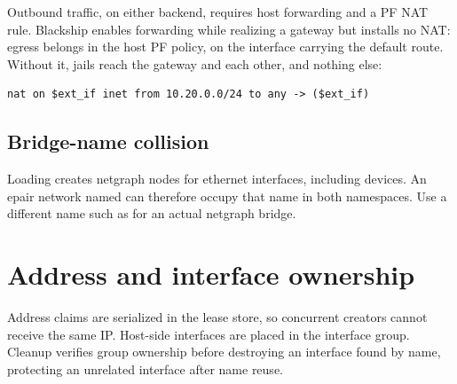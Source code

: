\begin{shipfigure}
\end{shipfigure}

Outbound traffic, on either backend, requires host forwarding and a PF NAT
rule. Blackship enables forwarding while realizing a gateway but installs no
NAT: egress belongs in the host PF policy, on the interface carrying the
default route. Without it, jails reach the gateway and each other, and nothing
else:

\begin{lstlisting}
nat on $ext_if inet from 10.20.0.0/24 to any -> ($ext_if)
\end{lstlisting}

\subsection{Bridge-name collision}

Loading  creates netgraph nodes for ethernet interfaces,
including  devices. An epair network named
 can therefore occupy that name in both namespaces. Use a
different name such as  for an actual netgraph bridge.

\section{Address and interface ownership}

Address claims are serialized in the lease store, so concurrent creators cannot
receive the same IP. Host-side interfaces are placed in the
 interface group. Cleanup verifies group ownership before
destroying an interface found by name, protecting an unrelated interface after
name reuse.

